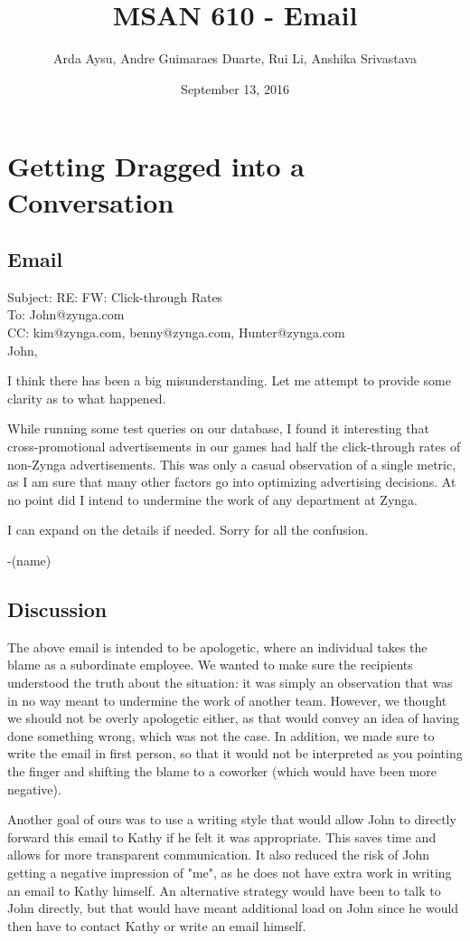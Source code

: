 \documentclass[]{article}
\title{MSAN 610 - Email}
\author{Arda Aysu, Andre Guimaraes Duarte, Rui Li, Anshika Srivastava}
\date{September 13, 2016}
\begin{document}
\maketitle

\section*{Getting Dragged into a Conversation}
\subsection*{Email}
\noindent Subject: RE: FW: Click-through Rates \\
To: John@zynga.com \\
CC:  kim@zynga.com, benny@zynga.com, Hunter@zynga.com \\
John,

I think there has been a big misunderstanding. Let me attempt to provide some clarity as to what happened.

While running some test queries on our database, I found it interesting that cross-promotional advertisements in our games had half the click-through rates of non-Zynga advertisements. This was only a casual observation of a single metric, as I am sure that many other factors go into optimizing advertising decisions. At no point did I intend to undermine the work of any department at Zynga.

I can expand on the details if needed. Sorry for all the confusion.

-(name)

\subsection*{Discussion}
The above email is intended to be apologetic, where an individual takes the blame as a subordinate employee. We wanted to make sure the recipients understood the truth about the situation: it was simply an observation that was in no way meant to undermine the work of another team. However, we thought we should not be overly apologetic either, as that would convey an idea of having done something wrong, which was not the case. In addition, we made sure to write the email in first person, so that it would not be interpreted as you pointing the finger and shifting the blame to a coworker (which would have been more negative).

Another goal of ours was to use a writing style that would allow John to directly forward this email to Kathy if he felt it was appropriate. This saves time and allows for more transparent communication. It also reduced the risk of John getting a negative impression of "me", as he does not have extra work in writing an email to Kathy himself. An alternative strategy would have been to talk to John directly, but that would have meant additional load on John since he would then have to contact Kathy or write an email himself.
\end{document}
